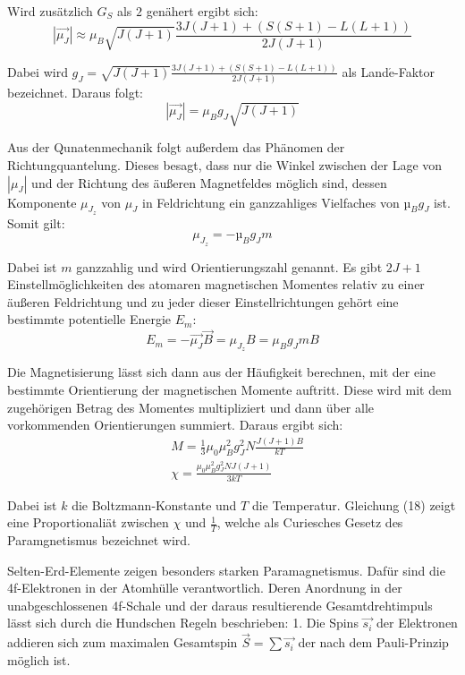 Wird zusätzlich $G_S$ als $2$ genähert ergibt sich:
\begin{equation}
  |\vec{\mu_J}| \approx \mu_B \sqrt{J(J+1)} \frac{3J(J+1)+ (S(S+1)-L(L+1))}{2J(J+1)}
\end{equation}

Dabei wird $g_J = \sqrt{J(J+1)} \frac{3J(J+1)+ (S(S+1)-L(L+1))}{2J(J+1)}$ als Land$\acute{\text{e}}$-Faktor bezeichnet.
Daraus folgt:
\begin{equation}
  |\vec{\mu_J}| = \mu_B g_J \sqrt{J(J+1)}
\end{equation}

Aus der Qunatenmechanik folgt außerdem das Phänomen der Richtungquantelung. Dieses besagt, dass nur die Winkel
zwischen der Lage von $|\mu_J|$ und der Richtung des äußeren Magnetfeldes möglich sind, dessen Komponente
$\mu_{J_z}$ von $\mu_J$ in Feldrichtung ein ganzzahliges Vielfaches von $µ_B g_J$ ist. Somit gilt:
\begin{equation}
  \mu_{J_z} = - µ_B g_J m
\end{equation}

Dabei ist $m$ ganzzahlig und wird Orientierungszahl genannt. Es gibt $2J + 1$ Einstellmöglichkeiten
des atomaren magnetischen Momentes relativ zu einer äußeren Feldrichtung und zu jeder dieser Einstellrichtungen
gehört eine bestimmte potentielle Energie $E_m$:
\begin{equation}
  E_m = - \vec{\mu_J} \vec{B} = \mu_{J_z} B = \mu_B g_J m B
\end{equation}

Die Magnetisierung lässt sich dann aus der Häufigkeit berechnen, mit der eine bestimmte Orientierung
der magnetischen Momente auftritt. Diese wird mit  dem
zugehörigen Betrag des Momentes multipliziert und dann über alle vorkommenden
Orientierungen summiert. Daraus ergibt sich:
\begin{align}
  &M = \frac{1}{3} \mu_0 \mu_B^2 g_J^2 N \frac{J(J+1)B}{kT} \\
  &\chi = \frac{\mu_0 \mu_B^2 g_J^2 N J(J+1)}{3kT}
\end{align}

Dabei ist $k$ die Boltzmann-Konstante und $T$ die Temperatur. Gleichung (18) zeigt eine
Proportionaliät zwischen $\chi$ und $\frac{1}{T}$, welche als Curiesches Gesetz des Paramgnetismus bezeichnet wird.

Selten-Erd-Elemente zeigen besonders starken Paramagnetismus. Dafür sind die 4f-Elektronen in der Atomhülle
verantwortlich. Deren Anordnung in der unabgeschlossenen 4f-Schale und der daraus resultierende Gesamtdrehtimpuls
lässt sich durch die Hundschen Regeln beschrieben:
1. Die Spins $\vec{s_i}$ der Elektronen addieren sich zum maximalen Gesamtspin $\vec{S} = \sum \vec{s_i}$ der nach dem Pauli-Prinzip möglich ist.

